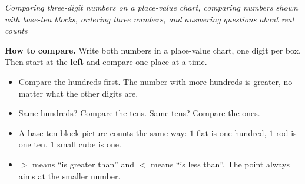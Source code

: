\documentclass[12pt]{article}
\begin{document}

\begin{center}
\textit{Comparing three-digit numbers on a place-value chart, comparing numbers
shown with base-ten blocks, ordering three numbers, and answering questions
about real counts}
\end{center}

\noindent\small
\textbf{How to compare.} Write both numbers in a place-value chart, one digit
per box. Then start at the \textbf{left} and compare one place at a time.
\begin{itemize}[leftmargin=1.1cm, itemsep=1pt, topsep=2pt]
  \item Compare the hundreds first. The number with more hundreds is greater,
        no matter what the other digits are.
  \item Same hundreds? Compare the tens. Same tens? Compare the ones.
  \item A base-ten block picture counts the same way: $1$ flat is one hundred,
        $1$ rod is one ten, $1$ small cube is one.
  \item $>$ means ``is greater than'' and $<$ means ``is less than''. The point
        always aims at the smaller number.
\end{itemize}
\normalsize

\vspace{0.15cm}


\end{document}
